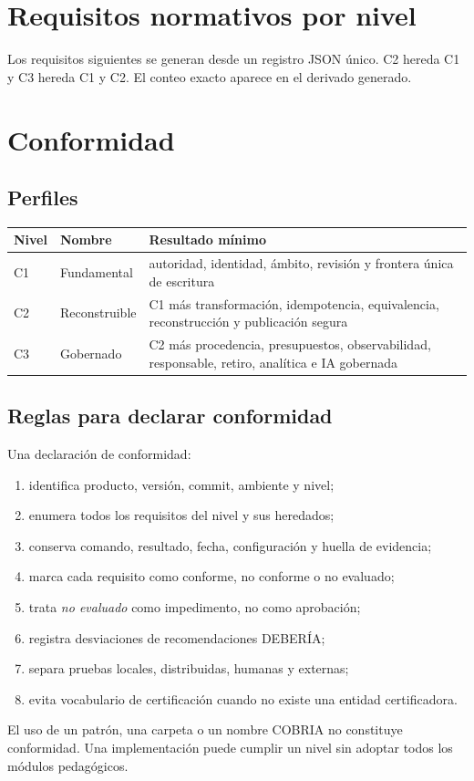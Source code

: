 \documentclass[11pt,letterpaper]{article}
\begin{document}
\section{Requisitos normativos por nivel}
Los requisitos siguientes se generan desde un registro JSON único. C2 hereda C1 y C3
hereda C1 y C2. El conteo exacto aparece en el derivado generado.


\section{Conformidad}
\subsection{Perfiles}
\begin{longtable}{p{.13\linewidth}p{.28\linewidth}p{.51\linewidth}}
\toprule Nivel & Nombre & Resultado mínimo \\ \midrule
C1 & Fundamental & autoridad, identidad, ámbito, revisión y frontera única de escritura \\
C2 & Reconstruible & C1 más transformación, idempotencia, equivalencia, reconstrucción y publicación segura \\
C3 & Gobernado & C2 más procedencia, presupuestos, observabilidad, responsable, retiro, analítica e IA gobernada \\ \bottomrule
\end{longtable}

\subsection{Reglas para declarar conformidad}
Una declaración de conformidad:
\begin{enumerate}
\item identifica producto, versión, commit, ambiente y nivel;
\item enumera todos los requisitos del nivel y sus heredados;
\item conserva comando, resultado, fecha, configuración y huella de evidencia;
\item marca cada requisito como conforme, no conforme o no evaluado;
\item trata \emph{no evaluado} como impedimento, no como aprobación;
\item registra desviaciones de recomendaciones DEBERÍA;
\item separa pruebas locales, distribuidas, humanas y externas;
\item evita vocabulario de certificación cuando no existe una entidad certificadora.
\end{enumerate}
El uso de un patrón, una carpeta o un nombre COBRIA no constituye conformidad. Una
implementación puede cumplir un nivel sin adoptar todos los módulos pedagógicos.
\end{document}
